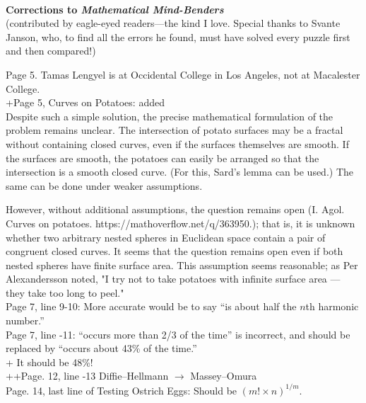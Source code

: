 \documentclass[11pt]{article}
\newlength{\originalbase}
\newcommand{\spacing}[1]{\setlength{\baselineskip}{#1\originalbase}}
\begin{document}
\spacing{1}

~

\begin{center}
{\bf \large Corrections to {\em Mathematical Mind-Benders}}\\[3mm]
(contributed by eagle-eyed readers---the kind I love.  Special
thanks to Svante Janson, who, to find all the errors he found,
must have solved every puzzle first and then compared!)
\end{center}

\bigskip

Page 5. Tamas Lengyel is at Occidental College in Los Angeles,
not at Macalester College.\\

+Page 5, Curves on Potatoes: added\\

Despite such a simple solution, the precise mathematical formulation of the problem remains unclear. The intersection of potato surfaces may be a fractal without containing closed curves, even if the surfaces themselves are smooth. If the surfaces are smooth, the potatoes can easily be arranged so that the intersection is a smooth closed curve. (For this, Sard's lemma can be used.) The same can be done under weaker assumptions.

However, without additional assumptions, the question remains open (I. Agol. Curves on potatoes. https://mathoverflow.net/q/363950.); that is, it is unknown whether two arbitrary nested spheres in Euclidean space contain a pair of congruent closed curves. It seems that the question remains open even if both nested spheres have finite surface area. This assumption seems reasonable; as Per Alexandersson noted, "I try not to take potatoes with infinite surface area — they take too long to peel."\\

Page 7, line 9-10: More accurate would be to say ``is about
half the $n$th harmonic number.''\\

Page 7, line -11: ``occurs more than 2/3 of the time'' is incorrect,
and should be replaced by ``occurs about 43\% of the time.''\\

+ It should be 48\%!\\

++Page. 12, line -13 Diffie--Hellmann $\to$ Massey--Omura\\

Page. 14, last line of Testing Ostrich Eggs: Should be $(m! \times n)^{1/m}$.\\
\end{document}
